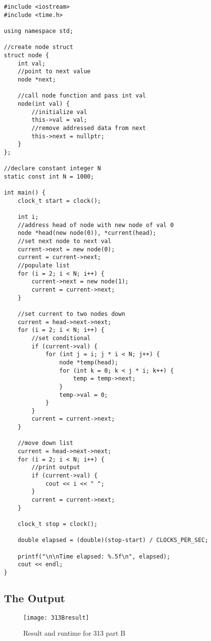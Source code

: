 \documentclass[11pt]{article}
\begin{document}
\begin{lstlisting}
#include <iostream>
#include <time.h>

using namespace std;

//create node struct
struct node {
    int val;
    //point to next value
    node *next;

    //call node function and pass int val
    node(int val) {
        //initialize val
        this->val = val;
        //remove addressed data from next
        this->next = nullptr;
    }
};

//declare constant integer N
static const int N = 1000;

int main() {
    clock_t start = clock();

    int i;
    //address head of node with new node of val 0
    node *head(new node(0)), *current(head);
    //set next node to next val
    current->next = new node(0);
    current = current->next;
    //populate list
    for (i = 2; i < N; i++) {
        current->next = new node(1);
        current = current->next;
    }

    //set current to two nodes down
    current = head->next->next;
    for (i = 2; i < N; i++) {
        //set conditional
        if (current->val) {
            for (int j = i; j * i < N; j++) {
                node *temp(head);
                for (int k = 0; k < j * i; k++) {
                    temp = temp->next;
                }
                temp->val = 0;
            }
        }
        current = current->next;
    }

    //move down list
    current = head->next->next;
    for (i = 2; i < N; i++) {
        //print output
        if (current->val) {
            cout << i << " ";
        }
        current = current->next;
    }

    clock_t stop = clock();

    double elapsed = (double)(stop-start) / CLOCKS_PER_SEC;

    printf("\n\nTime elapsed: %.5f\n", elapsed);
    cout << endl;
}
\end{lstlisting}

\subsection*{The Output}

\begin{figure}[h]
    \centering
    \texttt{[image: 313Bresult]}
    \caption{Result and runtime for 313 part B}
    \label{fig:my_label}
\end{figure}
\end{document}
